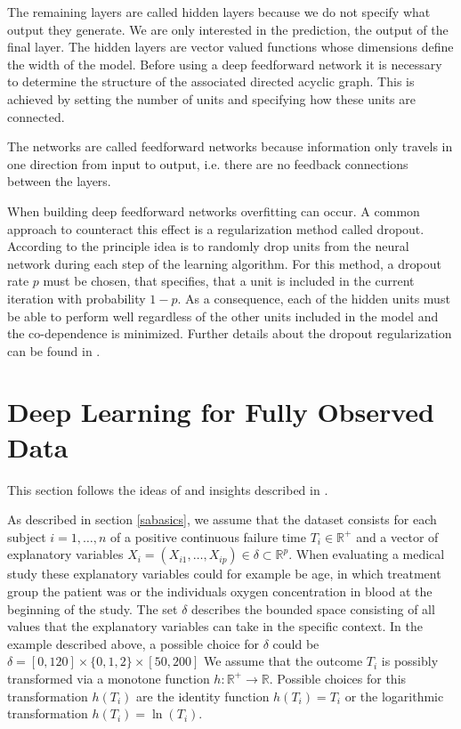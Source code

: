 \documentclass[12pt, a4paper]{article}
\theoremstyle{definition}
\theoremstyle{plain}
\numberwithin{equation}{section}
\numberwithin{figure}{section}
\numberwithin{table}{section}
\begin{document}
	The remaining layers are called hidden layers because we do not specify what output they generate.
	We are only interested in the prediction, the output of the final layer.
	The hidden layers are vector valued functions whose dimensions define the width of the model.
	Before using a deep feedforward network it is necessary to determine the structure of the associated directed acyclic graph.
	This is achieved by setting the number of units and specifying how these units are connected.
	
	The networks are called feedforward networks because information only travels in one direction from input to output, i.e. there are no feedback connections between the layers.
	
	
	When building deep feedforward networks overfitting can occur.
	A common approach to counteract this effect is a regularization method called dropout.
	According to \citet*{dropout} the principle idea is to randomly drop units from the neural network during each step of the learning algorithm.
	For this method, a dropout rate $p$ must be chosen, that specifies, that a unit is included in the current iteration with probability $1-p$.
	As a consequence, each of the hidden units must be able to perform well regardless of the other units included in the model and the co-dependence is minimized.
	Further details about the dropout regularization can be found in \citet*{dropout}.
	
	
	\newpage
	
	\section{Deep Learning for Fully Observed Data} \label{uncensored}
	This section follows the ideas of \citet*{basearticle} and insights described in \citet*{deeplbook}.
	
	As described in section \ref{sabasics}, we assume that the dataset consists for each subject $i = 1,\dots,n$ of a positive continuous failure time $T_i \in \mathbb{R}^+$ and a vector of explanatory variables $X_i = (X_{i1}, \dots , X_{ip}) \in \delta \subset \mathbb{R}^p$.
	When evaluating a medical study these explanatory variables could for example be age, in which treatment group the patient was or the individuals oxygen concentration in blood at the beginning of the study.
	The set $\delta$ describes the bounded space consisting of all values that the explanatory variables can take in the specific context.
	In the example described above, a possible choice for $\delta$ could be $\delta = [0, 120] \times \{0,1,2\} \times [50, 200]$
	We assume that the outcome $T_i$ is possibly transformed via a monotone function $h: \mathbb{R}^+ \rightarrow \mathbb{R}$.
	Possible choices for this transformation $h(T_i)$ are the identity function $h(T_i)=T_i$ or the logarithmic transformation $h(T_i)= \ln (T_i)$.
	
\end{document}
